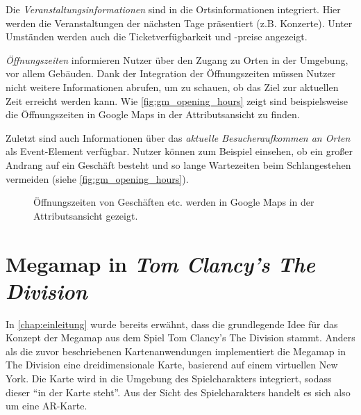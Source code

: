 Die \emph{Veranstaltungsinformationen} sind in die Ortsinformationen integriert.
Hier werden die Veranstaltungen der nächsten Tage präsentiert (z.B. Konzerte).
Unter Umständen werden auch die Ticketverfügbarkeit und -preise angezeigt.

\emph{Öffnungszeiten} informieren Nutzer über den Zugang zu Orten in der Umgebung, vor allem Gebäuden.
Dank der Integration der Öffnungszeiten müssen Nutzer nicht weitere Informationen abrufen, um zu schauen, ob das Ziel zur aktuellen Zeit erreicht werden kann.
Wie \autoref{fig:gm_opening_hours} zeigt sind beispielsweise die Öffnungszeiten in Google Maps in der Attributsansicht zu finden.

Zuletzt sind auch Informationen über das \emph{aktuelle Besucheraufkommen an Orten} als Event-Element verfügbar.
Nutzer können zum Beispiel einsehen, ob ein großer Andrang auf ein Geschäft besteht und so lange Wartezeiten beim Schlangestehen vermeiden (siehe \autoref{fig:gm_opening_hours}).
\begin{figure}[th]
	\centering
	\caption{Öffnungszeiten von Geschäften etc. werden in Google Maps in der Attributsansicht gezeigt.}
	\label{fig:gm_opening_hours}
\end{figure}

\section{Megamap in \emph{Tom Clancy's The Division}}
In \autoref{chap:einleitung} wurde bereits erwähnt, dass die grundlegende Idee für das Konzept der Megamap aus dem Spiel Tom Clancy's The Division stammt.
Anders als die zuvor beschriebenen Kartenanwendungen implementiert die Megamap in The Division eine dreidimensionale Karte, basierend auf einem virtuellen New York.
Die Karte wird in die Umgebung des Spielcharakters integriert, sodass dieser \enquote{in der Karte steht}.
Aus der Sicht des Spielcharakters handelt es sich also um eine AR-Karte.

